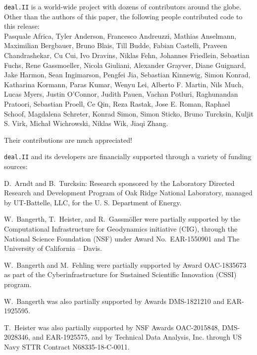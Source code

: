 \documentclass{ansarticle-preprint}
\newcommand{\specialword}[1]{\texttt{#1}}
\newcommand{\dealii}{{\specialword{deal.II}}\xspace}
\begin{document}
\dealii{} is a world-wide project with dozens of contributors around the
globe. Other than the authors of this paper, the following people
contributed code to this release:\\
%
%
Pasquale	Africa,
Tyler	Anderson,
Francesco	Andreuzzi,
Mathias	Anselmann,
Maximilian	Bergbauer,
Bruno	Blais,
Till	Budde,
Fabian	Castelli,
Praveen	Chandrashekar,
Cu	Cui,
Ivo	Dravins,
Niklas	Fehn,
Johannes	Friedlein,
Sebastian	Fuchs,
Rene	Gassmoeller,
Nicola	Giuliani,
Alexander	Grayver,
Diane	Guignard,
Jake	Harmon,
Sean	Ingimarson,
Pengfei	Jia,
Sebastian	Kinnewig,
Simon	Konrad,
Katharina	Kormann,
Paras	Kumar,
Wenyu	Lei,
Alberto F.	Martin,
Nils	Much,
Lucas	Myers,
Justin	O'Connor,
Judith	Pauen,
Vachan	Potluri,
Raghunandan	Pratoori,
Sebastian	Proell,
Ce	Qin,
Reza	Rastak,
Jose E.	Roman,
Raphael	Schoof,
Magdalena	Schreter,
Konrad	Simon,
Simon	Sticko,
Bruno	Turcksin,
Kuljit S.	Virk,
Michał	Wichrowski,
Niklas Wik,
Jiaqi	Zhang.


Their contributions are much appreciated!


\bigskip

\dealii{} and its developers are financially supported through a
variety of funding sources:


D.~Arndt and B.~Turcksin: Research sponsored by the Laboratory Directed Research and
Development Program of Oak Ridge National Laboratory, managed by UT-Battelle,
LLC, for the U. S. Department of Energy.

W.~Bangerth, T.~Heister, and R.~Gassm{\"o}ller were partially
supported by the Computational Infrastructure for Geodynamics initiative
(CIG), through the National Science Foundation (NSF) under Award
No.~EAR-1550901 and The University of California -- Davis.

W.~Bangerth and M.~Fehling were partially supported by Award OAC-1835673
as part of the Cyberinfrastructure for Sustained Scientific Innovation (CSSI)
program.

W.~Bangerth was also partially supported by Awards DMS-1821210 and EAR-1925595.

T.~Heister was also partially supported by NSF
Awards OAC-2015848, DMS-2028346, and
EAR-1925575, and by Technical Data Analysis, Inc. through US Navy STTR
Contract N68335-18-C-0011.
\end{document}
